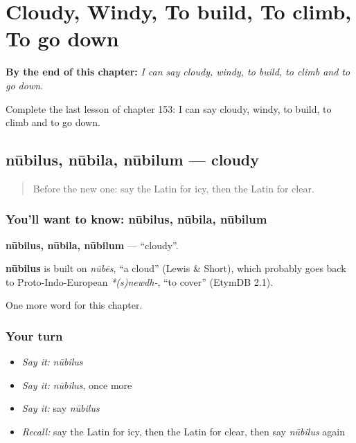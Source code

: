 
\chapter{Cloudy, Windy, To build, To climb, To go down}
\label{ch:la-cloudy-windy-to-build-to-climb-to-go-down}

\begin{chapteropening}
\textbf{By the end of this chapter:} \emph{I can say cloudy, windy, to build, to climb and to go down.}

Complete the last lesson of chapter 153: I can say cloudy, windy, to build, to climb and to go down.
\end{chapteropening}

\section[nūbilus, nūbila, nūbilum]{nūbilus, nūbila, nūbilum — cloudy}

\label{lesson:LA-C153-nubilus}



\begin{quote}
Before the new one: say the Latin for icy, then the Latin for clear.
\end{quote}

\subsection*{You'll want to know: nūbilus, nūbila, nūbilum}
\textbf{nūbilus, nūbila, nūbilum} — \textquotedblleft{}cloudy\textquotedblright{}.

\begin{cousinweb}
\textbf{nūbilus} is built on \emph{nūbēs}, \textquotedblleft{}a cloud\textquotedblright{} (Lewis \& Short), which probably goes back to Proto-Indo-European \emph{*(s)newdh-}, \textquotedblleft{}to cover\textquotedblright{} (EtymDB 2.1).
\end{cousinweb}

\begin{grammarlens}[title={What you've built}]
One more word for this chapter.
\end{grammarlens}

\subsection*{Your turn}
\begin{itemize}
\raggedright
  \item \emph{Say it:} \emph{nūbilus}
  \item \emph{Say it:} \emph{nūbilus}, once more
  \item \emph{Say it:} say \emph{nūbilus}
  \item \emph{Recall:} say the Latin for icy, then the Latin for clear, then say \emph{nūbilus} again
\end{itemize}

